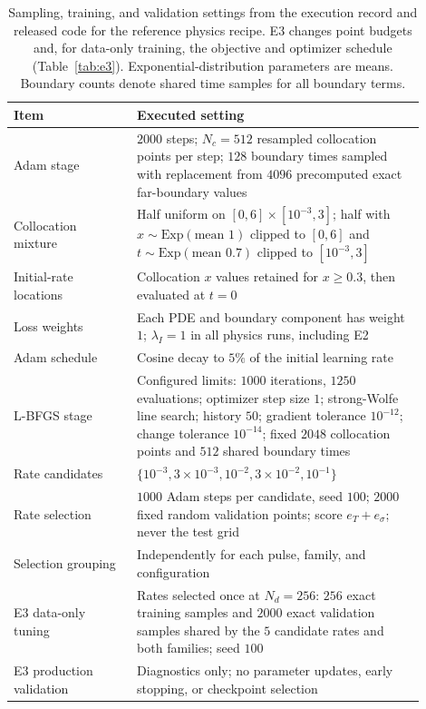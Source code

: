 \documentclass[11pt]{article}
\begin{document}
\begin{table}[htbp]
\centering
\caption{Sampling, training, and validation settings from the execution
record and released code for the reference physics recipe. E3 changes
point budgets and, for data-only training, the objective and optimizer
schedule (Table~\ref{tab:e3}). Exponential-distribution parameters are
means. Boundary counts denote shared time samples for all boundary terms.}
\label{tab:training}
\begin{tabular}{p{0.27\linewidth}p{0.63\linewidth}}
\toprule
Item & Executed setting \\
\midrule
Adam stage & $2000$ steps; $N_c=512$ resampled collocation points per step;
$128$ boundary times sampled with replacement from $4096$ precomputed
exact far-boundary values \\
Collocation mixture & Half uniform on $[0,6]\times[10^{-3},3]$;
half with $x\sim\mathrm{Exp}(\text{mean }1)$ clipped to $[0,6]$
and $t\sim\mathrm{Exp}(\text{mean }0.7)$ clipped to $[10^{-3},3]$ \\
Initial-rate locations & Collocation $x$ values retained for $x\ge0.3$,
then evaluated at $t=0$ \\
Loss weights & Each PDE and boundary component has weight $1$;
$\lambda_I=1$ in all physics runs, including E2 \\
Adam schedule & Cosine decay to $5\%$ of the initial learning rate \\
L-BFGS stage & Configured limits: $1000$ iterations, $1250$ evaluations;
optimizer step size $1$; strong-Wolfe line search; history $50$;
gradient tolerance $10^{-12}$; change tolerance $10^{-14}$;
fixed $2048$ collocation points and $512$ shared boundary times \\
Rate candidates & $\{10^{-3},3\times10^{-3},10^{-2},3\times10^{-2},10^{-1}\}$ \\
Rate selection & $1000$ Adam steps per candidate, seed $100$;
$2000$ fixed random validation points; score $e_T+e_\sigma$;
never the test grid \\
Selection grouping & Independently for each pulse, family, and configuration \\
E3 data-only tuning & Rates selected once at $N_d=256$: $256$ exact
training samples and $2000$ exact validation samples shared by the
$5$ candidate rates and both families; seed $100$ \\
E3 production validation & Diagnostics only; no parameter updates,
early stopping, or checkpoint selection \\
\bottomrule
\end{tabular}
\end{table}
\end{document}

